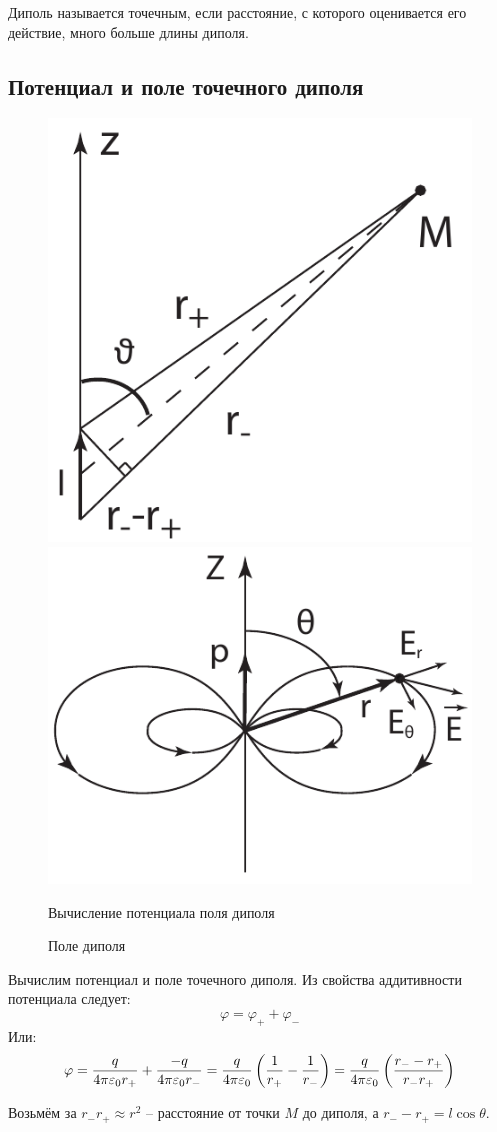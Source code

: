     Диполь называется точечным, если расстояние, с которого оценивается его 
    действие, много больше длины диполя.
    
\subsection{Потенциал и поле точечного диполя}

    \begin{figure}[b]
        \center
        \includegraphics[width=.47\textwidth]{lec03/dipole_calculate.pdf}
        \hfill
        \includegraphics[width=.47\textwidth]{lec03/dipole_field.pdf}
        \parbox[t]{.47\textwidth}{\caption{Вычисление потенциала поля диполя}}
        \hfill
        \parbox[t]{.47\textwidth}{\caption{Поле диполя}}
    \end{figure}

    Вычислим потенциал и поле точечного диполя. Из свойства аддитивности
    потенциала следует:
    \[
        \varphi = \varphi_{+} + \varphi_{-}
    \]
    Или:
    \[
        \varphi = \frac{q}{4\pi\varepsilon_0 r_+} + \frac{-q}{4\pi\varepsilon_0 r_-} = 
        \frac{q}{4\pi\varepsilon_0} \left(\frac{1}{r_+} - \frac{1}{r_-}\right) = 
        \frac{q}{4\pi\varepsilon_0} \left(\frac{r_- - r_+}{r_-r_+}\right)
    \]
    
    Возьмём за \( r_-r_+  \approx r^2 \) -- расстояние от точки \( M \) до 
    диполя, а \( r_- - r_+ = l\cos\theta \).
    
